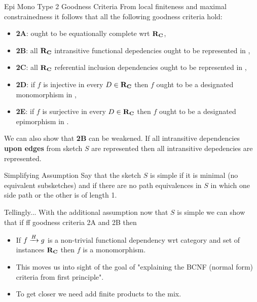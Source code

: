 \documentclass[xcolor=pst,dvips]{beamer}   %
\begin{document}
\begin{frame}{Epi Mono Type 2 Goodness Criteria}
From local finiteness and maximal constrainedness it follows that all the following goodness criteria hold: 
\begin{itemize}
\item \textbf{2A}:  \catcw ought to be equationally complete wrt $\reqtc$,         
\item \textbf{2B}:  all $\reqtc$ intransitive functional depedencies ought to be represented in \catc,
\item \textbf{2C}:  all $\reqtc$ referential inclusion dependencies ought to be represented in \catc, 
\pause \item \textbf{2D}:  if $f$ is injective in every $D \in \reqtc$ then $f$ ought to be a designated monomorphism in \catc,
\pause \item \textbf{2E}:  if $f$ is surjective in every $D \in \reqtc$ then $f$ ought to be a designated epimorphism in \catc.
\end{itemize}
We can also show that \textbf{2B} can be weakened. If all intransitive dependencies \textbf{upon edges} from sketch $S$ are represented then 
all intransitive depedencies are represented.
\end{frame}

\begin{frame}{Simplifying Assumption}
Say that the sketch $S$ is simple if it is minimal (no equivalent subsketches) and if there are no path equivalences in $S$ in which one side path or the other is of length 1.  
\end{frame}


\begin{frame}{Tellingly...}
With the additional assumption now that $S$ is simple we can show that if
ff goodness criteria 2A and 2B then 
\begin{itemize}
\item If $\fundep{H}{f}{g}$ is a non-trivial   functional dependency wrt  category \catcw and set of instances $\reqtc$
 then $f$ is a monomorphism.

\item This moves us into sight of the goal of "explaining the BCNF (normal form) criteria from first principle". 

\item To get closer we need add finite products to the mix.
\end{itemize}
\end{frame}
\end{document}
